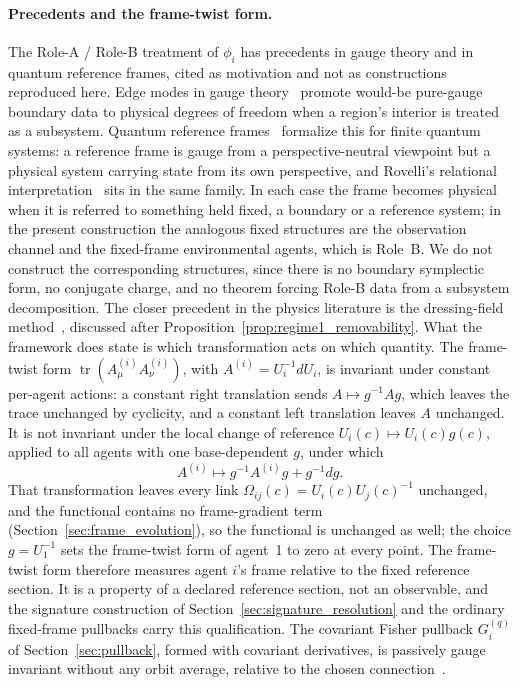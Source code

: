 \paragraph{Precedents and the frame-twist form.}
\label{sec:dual_role_rigor}
The Role-A / Role-B treatment of $\phi_i$ has precedents in gauge theory and in quantum reference frames, cited as motivation and not as constructions reproduced here. Edge modes in gauge theory~\cite{DonnellyFreidel2016} promote would-be pure-gauge boundary data to physical degrees of freedom when a region's interior is treated as a subsystem. Quantum reference frames~\cite{BartlettRudolphSpekkens2007, Vanrietvelde2020, giacomini2019qrf} formalize this for finite quantum systems: a reference frame is gauge from a perspective-neutral viewpoint but a physical system carrying state from its own perspective, and Rovelli's relational interpretation~\cite{Rovelli1996} sits in the same family. In each case the frame becomes physical when it is referred to something held fixed, a boundary or a reference system; in the present construction the analogous fixed structures are the observation channel and the fixed-frame environmental agents, which is Role~B. We do not construct the corresponding structures, since there is no boundary symplectic form, no conjugate charge, and no theorem forcing Role-B data from a subsystem decomposition. The closer precedent in the physics literature is the dressing-field method~\cite{Fournel2014Dressing}, discussed after Proposition~\ref{prop:regime1_removability}. What the framework does state is which transformation acts on which quantity. The frame-twist form $\operatorname{tr}(A^{(i)}_\mu A^{(i)}_\nu)$, with $A^{(i)} = U_i^{-1}dU_i$, is invariant under constant per-agent actions: a constant right translation sends $A \mapsto g^{-1}Ag$, which leaves the trace unchanged by cyclicity, and a constant left translation leaves $A$ unchanged. It is not invariant under the local change of reference $U_i(c) \mapsto U_i(c)g(c)$, applied to all agents with one base-dependent $g$, under which
\begin{equation}
A^{(i)} \longmapsto g^{-1}A^{(i)}g + g^{-1}dg .
\end{equation}
That transformation leaves every link $\Omega_{ij}(c) = U_i(c)U_j(c)^{-1}$ unchanged, and the functional contains no frame-gradient term (Section~\ref{sec:frame_evolution}), so the functional is unchanged as well; the choice $g = U_1^{-1}$ sets the frame-twist form of agent~1 to zero at every point. The frame-twist form therefore measures agent $i$'s frame relative to the fixed reference section. It is a property of a declared reference section, not an observable, and the signature construction of Section~\ref{sec:signature_resolution} and the ordinary fixed-frame pullbacks carry this qualification. The covariant Fisher pullback $G^{(q)}_i$ of Section~\ref{sec:pullback}, formed with covariant derivatives, is passively gauge invariant without any orbit average, relative to the chosen connection~\cite[Ch.~B2]{DennisGaugeVFESuppB2026}.

